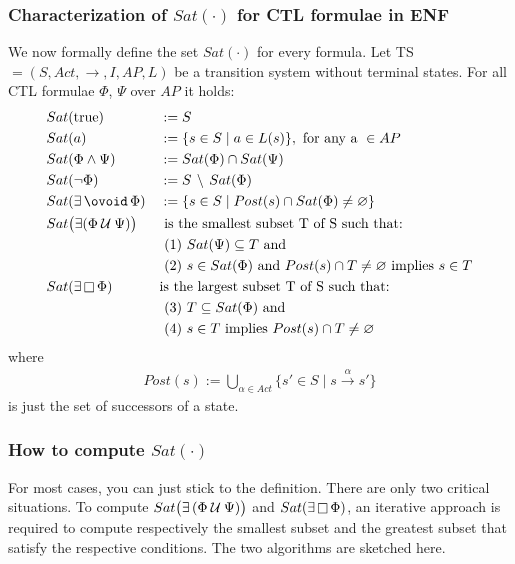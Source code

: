 \documentclass{article}
\begin{document}
\subsubsection*{Characterization of $Sat(\cdot)$ for CTL formulae in ENF}
We now formally define the set $Sat(\cdot)$ for every formula.
Let TS $ = (S, Act, \rightarrow, I, AP, L)$ be a transition system without terminal states. 
For all CTL formulae $\Phi$, $\Psi$ over $AP$ it holds:
\begin{alignat*}{3}
    & Sat(\text{true})          && := S \\
    & Sat(a)                    && := \{ s \in S \mid a \in L(s) \}, \text{ for any a } \in AP \\ 
    & Sat( \Phi \land \Psi)     && := Sat(\Phi) \cap Sat(\Psi) \\ 
    & Sat(\neg \Phi)            && := S \, \setminus \, Sat(\Phi) \\ 
    & Sat(\exists \lnext{\Phi}) && := \{ s \in S \mid Post(s) \cap Sat(\Phi) \neq \varnothing \}\\
    & Sat\big(\exists (\lluntil{\Phi}{\Psi}) \big) && \text{ is the smallest subset T of S such that:} \\
    &&& \text{ (1) } Sat(\Psi) \subseteq T \text{ and } \\
    &&& \text{ (2) } s \in Sat(\Phi) \text{ and } Post(s) \cap T \neq \varnothing \text{ implies } s \in T \\
    & Sat(\exists \llglob \Phi) && \text{is the largest subset T of S such that:}\\
    &&& \text{ (3) } T \subseteq Sat(\Phi) \text{ and } \\
    &&& \text{ (4) } s \in T \text{ implies } Post(s) \cap T \neq \varnothing \\
\end{alignat*}
where
\begin{align*}
    Post(s) := \bigcup_{\alpha \in Act} \{ s' \in S \mid s \xrightarrow{\alpha} s' \}
\end{align*}
is just the set of successors of a state.

\subsubsection{How to compute $Sat(\cdot)$}
For most cases, you can just stick to the definition. There are only two critical situations.
To compute $Sat\big(\exists \, (\Phi \mathbin{\mathcal{U}} \Psi) \big)$ and $Sat(\exists \mathop{\Box} \Phi)$, 
an iterative approach is required to compute respectively the smallest subset and the greatest subset 
that satisfy the respective conditions. The two algorithms are sketched here.
\end{document}
